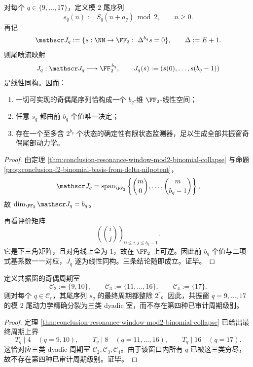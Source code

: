 \begin{theorem}[共振窗奇偶尾喷流的有限维完全性]\label{thm:conclusion-resonance-window-mod2-tail-jet-completeness}
对每个 \(q\in\{9,\dots,17\}\)，定义模 \(2\) 尾序列
\[
s_q(n):=S_q(n+a_q)\bmod 2,
\qquad
n\ge 0.
\]
再记
\[
\mathscr J_q:=
\{s:\NN\to\FF_2:\ \Delta^{b_q}s=0\},
\qquad
\Delta:=E+1.
\]
则尾喷流映射
\[
J_q:\mathscr J_q\longrightarrow \FF_2^{\,b_q},
\qquad
J_q(s):=(s(0),\dots,s(b_q-1))
\]
是线性同构。因而：
\begin{enumerate}
\normalfont
  \item 一切可实现的奇偶尾序列恰构成一个 \(b_q\)-维 \(\FF_2\)-线性空间；
  \item 任意 \(s_q\) 都由前 \(b_q\) 个值唯一决定；
  \item 存在一个至多含 \(2^{b_q}\) 个状态的确定性有限状态监测器，足以生成全部共振窗奇偶尾部动力学。
\end{enumerate}
\end{theorem}
\begin{proof}
由定理 \ref{thm:conclusion-resonance-window-mod2-binomial-collapse} 与命题 \ref{prop:conclusion-f2-binomial-basis-from-delta-nilpotent}，
\[
\mathscr J_q
=
\operatorname{span}_{\FF_2}
\left\{
\binom{m}{0},\dots,\binom{m}{b_q-1}
\right\},
\]
故 \(\dim_{\FF_2}\mathscr J_q=b_q\)。

再看评价矩阵
\[
\left(\binom{i}{j}\right)_{0\le i,j\le b_q-1}.
\]
它是下三角矩阵，且对角线上全为 \(1\)，故在 \(\FF_2\) 上可逆。因此前 \(b_q\) 个值与二项式基系数一一对应，\(J_q\) 遂为线性同构。三条结论随即成立。证毕。
\end{proof}

\begin{theorem}\label{thm:conclusion-resonance-window-dyadic-chambers}
定义共振窗的奇偶周期室
\[
\mathcal C_2:=\{9,10\},
\qquad
\mathcal C_3:=\{11,\dots,16\},
\qquad
\mathcal C_4:=\{17\}.
\]
则对每个 \(q\in\mathcal C_r\)，其尾序列 \(s_q\) 的最终周期都整除 \(2^r\)。因此，共振窗 \(q=9,\dots,17\) 的模 \(2\) 尾动力学精确分裂为三类 dyadic 室，而不存在第四种已审计周期级别。
\end{theorem}
\begin{proof}
定理 \ref{thm:conclusion-resonance-window-mod2-binomial-collapse} 已给出最终周期上界
\[
T_q\mid 4\quad(q=9,10),
\qquad
T_q\mid 8\quad(q=11,\dots,16),
\qquad
T_q\mid 16\quad(q=17).
\]
这恰对应三类 dyadic 周期室 \(\mathcal C_2,\mathcal C_3,\mathcal C_4\)。由于该窗口内所有 \(q\) 已被这三类穷尽，故不存在第四种已审计周期级别。证毕。
\end{proof}


